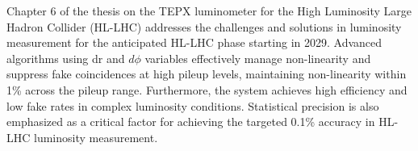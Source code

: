 Chapter 6 of the thesis on the TEPX luminometer for the High Luminosity Large Hadron Collider (HL-LHC) addresses the challenges and solutions in luminosity measurement for the anticipated HL-LHC phase starting in 2029. %
Advanced algorithms using dr and $d\phi$ variables effectively manage non-linearity and suppress fake coincidences at high pileup levels, maintaining non-linearity within 1\% across the pileup range. Furthermore, the system achieves high efficiency and low fake rates in complex luminosity conditions. Statistical precision is also emphasized as a critical factor for achieving the targeted 0.1\% accuracy in HL-LHC luminosity measurement.







